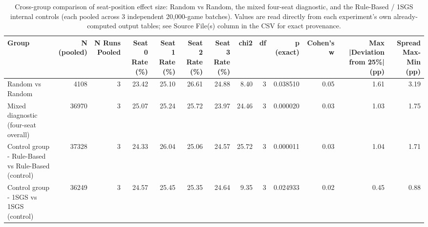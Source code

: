 \begin{table}[htbp]
\centering
\caption{Cross-group comparison of seat-position effect size: Random vs Random, the mixed four-seat diagnostic, and the Rule-Based / 1SGS internal controls (each pooled across 3 independent 20{,}000-game batches). Values are read directly from each experiment's own already-computed output tables; see Source File(s) column in the CSV for exact provenance.}
\label{tab:seat_four_group_cross}
\begin{tabular}{lrrrrrrrrrrrr}
\toprule
Group & N (pooled) & N Runs Pooled & Seat 0 Rate (\%) & Seat 1 Rate (\%) & Seat 2 Rate (\%) & Seat 3 Rate (\%) & chi2 & df & p (exact) & Cohen's w & Max |Deviation from 25\%| (pp) & Spread Max-Min (pp) \\
\midrule
Random vs Random & 4108 & 3 & 23.42 & 25.10 & 26.61 & 24.88 & 8.40 & 3 & 0.038510 & 0.05 & 1.61 & 3.19 \\
Mixed diagnostic (four-seat overall) & 36970 & 3 & 25.07 & 25.24 & 25.72 & 23.97 & 24.46 & 3 & 0.000020 & 0.03 & 1.03 & 1.75 \\
Control group - Rule-Based vs Rule-Based (control) & 37328 & 3 & 24.33 & 26.04 & 25.06 & 24.57 & 25.72 & 3 & 0.000011 & 0.03 & 1.04 & 1.71 \\
Control group - 1SGS vs 1SGS (control) & 36249 & 3 & 24.57 & 25.45 & 25.35 & 24.64 & 9.35 & 3 & 0.024933 & 0.02 & 0.45 & 0.88 \\
\bottomrule
\end{tabular}
\end{table}